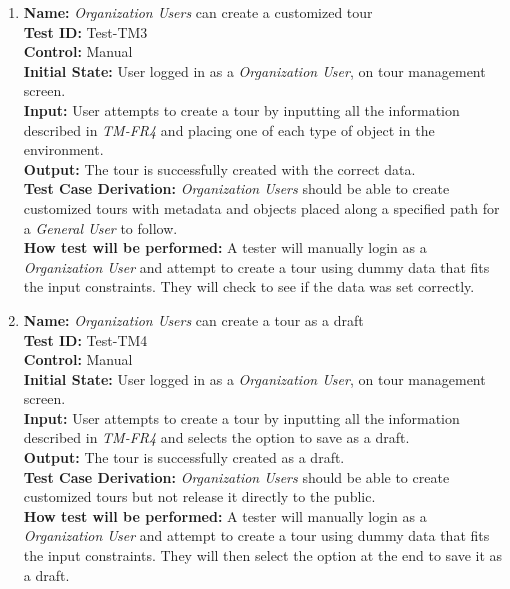\documentclass[12pt, titlepage]{article}
\begin{document}
\begin{enumerate}
    \item
    \textbf{Name:} \textit{Organization Users} can create a customized tour \label{itm:Test-TM3} \\
    \textbf{Test ID:} Test-TM3 \\
    \textbf{Control:} Manual \\
    \textbf{Initial State:} User logged in as a \textit{Organization User}, on tour management screen. \\
    \textbf{Input:} User attempts to create a tour by inputting all the information described in \textit{TM-FR4} and placing one of each type of object in the environment. \\
    \textbf{Output:} The tour is successfully created with the correct data. \\
    \textbf{Test Case Derivation:} \textit{Organization Users} should be able to create customized tours with metadata and objects placed along a specified path for a \textit{General User} to follow. \\
    \textbf{How test will be performed:} A tester will manually login as a \textit{Organization User} and attempt to create a tour using dummy data that fits the input constraints. They will check to see if the data was set correctly.

    \item
    \textbf{Name:} \textit{Organization Users} can create a tour as a draft \label{itm:Test-TM4} \\
    \textbf{Test ID:} Test-TM4 \\
    \textbf{Control:} Manual \\
    \textbf{Initial State:} User logged in as a \textit{Organization User}, on tour management screen. \\
    \textbf{Input:} User attempts to create a tour by inputting all the information described in \textit{TM-FR4} and selects the option to save as a draft. \\
    \textbf{Output:} The tour is successfully created as a draft. \\
    \textbf{Test Case Derivation:} \textit{Organization Users} should be able to create customized tours but not release it directly to the public. \\
    \textbf{How test will be performed:} A tester will manually login as a \textit{Organization User} and attempt to create a tour using dummy data that fits the input constraints. They will then select the option at the end to save it as a draft.


\end{enumerate}
\end{document}
